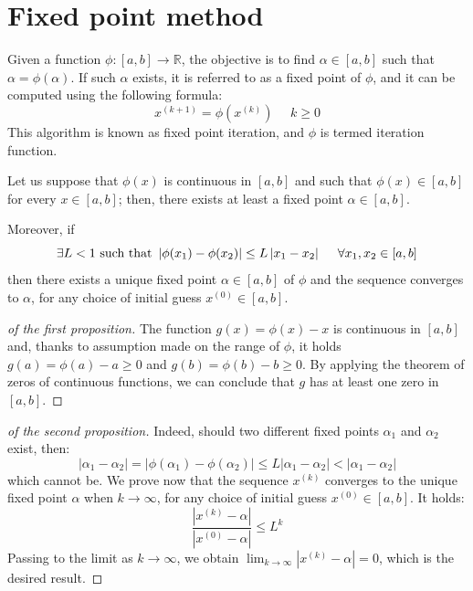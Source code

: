 \documentclass[12pt, a4paper]{report}
\begin{document}
    \section{Fixed point method}
    Given a function $\phi:[a,b] \rightarrow \mathbb{R}$, the objective is to find $\alpha \in [a,b]$ such that $\alpha=\phi(\alpha)$. 
    If such $\alpha$ exists, it is referred to as a fixed point of $\phi$, and it can be computed using the following formula:
    \[x^{(k+1)}=\phi(x^{(k)}) \:\:\:\:\:\: k \geq 0\]
    This algorithm is known as fixed point iteration, and $\phi$ is termed iteration function.
    \begin{proposition}
        Let us suppose that $\phi(x)$ is continuous in $[a,b]$ and such that $\phi(x) \in [a,b]$ for every $x \in [a,b]$; then, there exists at least a fixed point $\alpha \in [a,b]$.
            
        Moreover, if 
        \[\exists L < 1 \textnormal{ such that } \left\lvert \phi(x_1)-\phi(x_2) \right\rvert \leq L\left\lvert x_1-x_2 \right\rvert  \:\:\:\:\:\: \forall x_1,x_2\in [a,b]\]
        then there exists a unique fixed point $\alpha \in [a,b]$ of $\phi$ and the sequence converges to $\alpha$, for any choice of initial guess $x^{(0)}\in [a,b]$.
    \end{proposition}
    \begin{proof}[of the first proposition]
        The function $g(x)=\phi(x)-x$ is continuous in $[a,b]$ and, thanks to assumption made on the range of $\phi$, it holds $g(a)=\phi(a)-a\geq 0$ and $g(b)=\phi(b)-b\geq 0$.
        By applying the theorem of zeros of continuous functions, we can conclude that $g$ has at least one zero in $[a,b]$. 
    \end{proof}
    \begin{proof}[of the second proposition]
        Indeed, should two different fixed points $\alpha_1$ and $\alpha_2$ exist, then: 
        \[\left\lvert \alpha_1-\alpha_2 \right\rvert = \left\lvert \phi(\alpha_1)-\phi(\alpha_2) \right\rvert \leq L \left\lvert \alpha_1-\alpha_2 \right\rvert < 
        \left\lvert \alpha_1-\alpha_2 \right\rvert\]
        which cannot be. 
        We prove now that the sequence $x^{(k)}$ converges to the unique fixed point $\alpha$ when $k \rightarrow \infty$, for any choice of initial guess $x^{(0)} \in [a,b]$. 
        It holds: 
        \[\dfrac{\left\lvert x^{(k)}-\alpha \right\rvert}{\left\lvert x^{(0)}-\alpha \right\rvert} \leq L^k\]
        Passing to the limit as $k \rightarrow \infty$, we obtain $\lim_{k \rightarrow \infty}{\left\lvert x^{(k)}-\alpha \right\rvert}=0$, which is the desired result. 
    \end{proof}
\end{document}
